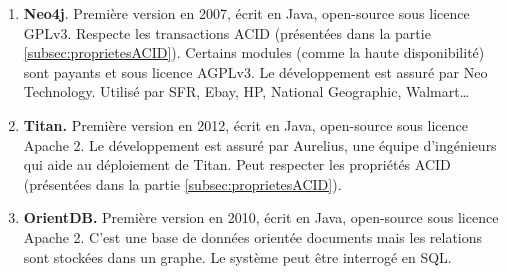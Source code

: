 	\begin{enumerate}
		\item \textbf{Neo4j}. Première version en 2007, écrit en Java, open-source sous licence GPLv3. Respecte les transactions ACID (présentées dans la partie \ref{subsec:proprietesACID}). Certains modules (comme la haute disponibilité) sont payants et sous licence AGPLv3. Le développement est assuré par Neo Technology. Utilisé par SFR, Ebay, HP, National Geographic, Walmart\dots
		\item \textbf{Titan.} Première version en 2012, écrit en Java, open-source sous licence Apache 2. Le développement est assuré par Aurelius, une équipe d'ingénieurs qui aide au déploiement de Titan. Peut respecter les propriétés ACID (présentées dans la partie \ref{subsec:proprietesACID}).
		\item \textbf{OrientDB.} Première version en 2010, écrit en Java, open-source sous licence Apache 2. C'est une base de données orientée documents mais les relations sont stockées dans un graphe. Le système peut être interrogé en SQL.
	\end{enumerate}
